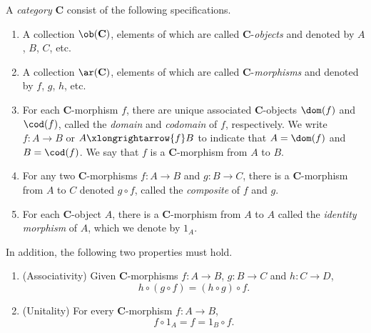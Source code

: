 \begin{definition}[Category]\label{def.category}
  A \textit{category}  \(\mathbf{C}\) consist of the following specifications.%
  \begin{enumerate}[label=(\roman*)]
    \item {} A collection \(\ob(\mathbf{C})\), elements of which are called \(\mathbf{C}\)-\textit{objects} and denoted by \(A\), \(B\), \(C\), etc.

    \item {} A collection \(\ar(\mathbf{C})\), elements of which are called \(\mathbf{C}\)-\textit{morphisms} and  denoted by \(f\), \(g\), \(h\), etc.

    \item {} For each \(\mathbf{C}\)-morphism \(f\), there are unique associated \(\mathbf{C}\)-objects \(\dom(f)\) and \(\cod(f)\), called the \textit{domain} and \textit{codomain} of \(f\), respectively. We write \(f\colon A\to B\) or \(A\xlongrightarrow{f} B\) to indicate that  \(A = \dom(f)\) and \(B = \cod(f)\). We say that \(f\) is a \(\mathbf{C}\)-morphism from \(A\) to \(B\).

    \item For any two \(\mathbf{C}\)-morphisms \(f\colon A\to B\) and \(g\colon B\to C\), there is a \(\mathbf{C}\)-morphism from \(A\) to \(C\) denoted \(g\circ f\), called the \textit{composite} of \(f\) and \(g\). %

    \item For each \(\mathbf{C}\)-object \(A\), there is a \(\mathbf{C}\)-morphism from \(A\) to \(A\) called the \textit{identity morphism} of \(A\), which we  denote by \(1_A\).
  \end{enumerate}
  In addition, the following two properties must hold.
  \begin{enumerate}[label=(\roman*), start=6]
    \item (Associativity)%
    Given \(\mathbf{C}\)-morphisms \(f\colon A \to B\), \(g\colon B\to C\) and \(h\colon C\to D\), \[
        h\circ (g\circ f) = (h\circ g) \circ f.
    \]
    \item (Unitality) For every \(\mathbf{C}\)-morphism \(f\colon A\to B\), \[f\circ 1_A = f = 1_B \circ f.\] 
  \end{enumerate}
\end{definition}

